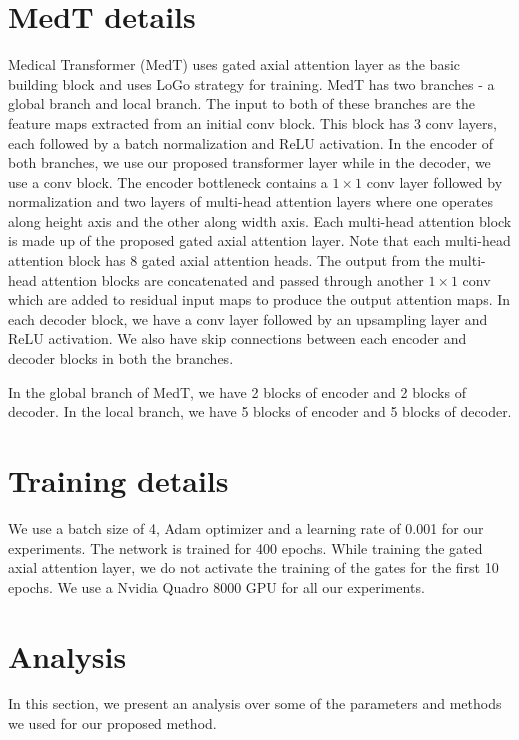 \documentclass[runningheads]{llncs}
\begin{document}
	


	\section{MedT details}
	
	Medical Transformer (MedT) uses gated axial attention layer as the basic building block and uses  LoGo strategy for training. MedT has two branches - a global branch and local branch. The input to both of these branches are the feature maps extracted from an initial conv block. This block has 3 conv layers, each followed by a batch normalization and ReLU activation. In the encoder of both branches, we use our proposed transformer layer while in the decoder, we use a conv block. The encoder bottleneck contains a $1 \times 1$ conv layer followed by normalization and two layers of multi-head attention layers where one operates along height axis and the other along width axis. Each multi-head attention block is made up of the proposed gated axial attention layer. Note that each multi-head attention block has 8 gated axial attention heads. The output from the multi-head attention blocks are concatenated and passed through another $1 \times 1$ conv which are added to residual input maps to produce the output attention maps. In each decoder block, we have a conv layer followed by an upsampling layer and ReLU activation. We also have skip connections between each encoder and decoder blocks in both the branches.
	
	In the global branch of MedT, we have 2 blocks of encoder and 2 blocks of decoder. In the local branch, we have 5 blocks of encoder and 5 blocks of decoder.  
	
	\section{Training details}
	
	We use a batch size of 4, Adam optimizer \cite{kingma2014adam} and a learning rate of 0.001 for our experiments. The network is trained for 400 epochs. While training the gated axial attention layer, we do not activate the training of the gates for the first 10 epochs. We use a Nvidia Quadro 8000 GPU for all our experiments. 
	
	\section{Analysis}
	In this section, we present an analysis over some of the parameters and methods we used for our proposed method.
	
\end{document}
